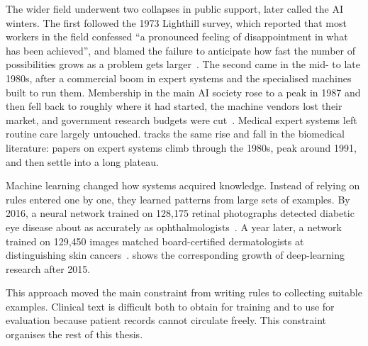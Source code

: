 \begin{reviewrewrite}
The wider field underwent two collapses in public support, later called the AI winters. The first followed the 1973 Lighthill survey, which reported that most workers in the field confessed ``a pronounced feeling of disappointment in what has been achieved'', and blamed the failure to anticipate how fast the number of possibilities grows as a problem gets larger~\citep{lighthill_1973}. The second came in the mid- to late 1980s, after a commercial boom in expert systems and the specialised machines built to run them. Membership in the main AI society rose to a peak in 1987 and then fell back to roughly where it had started, the machine vendors lost their market, and government research budgets were cut~\citep{nilsson_2010}. Medical expert systems left routine care largely untouched.  tracks the same rise and fall in the biomedical literature: papers on expert systems climb through the 1980s, peak around 1991, and then settle into a long plateau.
\end{reviewrewrite}

\begin{reviewrewrite}
Machine learning changed how systems acquired knowledge. Instead of relying on
rules entered one by one, they learned patterns from large sets of examples. By
2016, a neural network trained on 128{,}175 retinal photographs detected diabetic
eye disease about as accurately as ophthalmologists~\citep{gulshan_2016}. A year
later, a network trained on 129{,}450 images matched board-certified
dermatologists at distinguishing skin cancers~\citep{esteva_2017}.
 shows the corresponding growth of deep-learning
research after 2015.

This approach moved the main constraint from writing rules to collecting suitable
examples. Clinical text is difficult both to obtain for training and to use for
evaluation because patient records cannot circulate freely. This constraint
organises the rest of this thesis.
\end{reviewrewrite}
